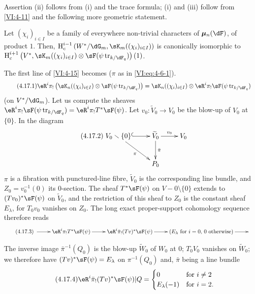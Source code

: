 Assertion (ii) follows from (i) and the trace formula; (i) and (iii)
follow from \ref{VI:4-11} and the following more geometric statement. 





\begin{proposition_}\label{VI:4-17}
Let $(\chi_i)_{i\in I}$ be a family of everywhere non-trivial characters of
$\dmu_n(\dF)$, of product $1$. Then, 
$\h_c^{i-1}\left(W^\ast/\dG_m,\sK_m((\chi_i)_{i\in I})\right)$ is
canonically isomorphic to 
\newline
$\h_c^{i+1}\left(V^\ast,\sK_m((\chi_i)_{i\in I})\otimes \sF(\psi\tr_{k/\dF_q})\right)(1)$. 
\end{proposition_}

The first line of \ref{VI:4-15} becomes ($\pi$ as in
\eqref{VI:eq:4-6-1}). 
\begin{equation*}\tag{4.17.1}\label{VI:eq:4-17-1}
  \eR^i \pi_!\left(\sK_n((\chi_i)_{i\in I})\otimes \sF(\psi \tr_{k/\dF_q})\right) = \sK_n((\chi_i)_{i\in I}) \otimes \eR^i \pi_! \sF(\psi\tr_{k/\dF_q}) 
\end{equation*}
(on $V^\ast/\dG_m$). Let us compute the sheaves
$\eR^i\pi_! \sF(\psi\tr_{k/\dF_q}) = \eR^i \pi_! T^\ast \sF(\psi)$. Let
$v_0:\widetilde V_0 \to V_0$ be the blow-up of $V_0$ at $\{0\}$. In the
diagram 
\begin{equation*}\tag{4.17.2}\label{VI:eq:4-17-2}
\xymatrix{
  V_0\setminus \{0\} \ar@{^{(}->}[r] \ar[dr]_-\pi 
    & \widetilde V_0 \ar[r]^-{v_0} \ar[d]^-{\bar\pi} 
    & V_0 \\
  & P_0 
}
\end{equation*}
$\pi$ is a fibration with punctured-line fibre, $\widetilde V_0$
is the corresponding line bundle, and $Z_0=v_0^{-1}(0)$ its $0$-section.
The sheaf $T^\ast\sF(\psi)$ on $V-0\setminus \{0\}$ extends to
$(T v_0)^\ast \sF(\psi)$ on $\widetilde V_0$, and the restriction of this sheaf
to $Z_0$ is the constant sheaf $E_\lambda$, for $T_0 v_0$ vanishes on
$Z_0$. The long exact proper-support cohomology sequence therefore
reads 
\begin{equation*}\tag{4.17.3}\label{VI:eq:4-17-3}
\xymatrix{
  \ar[r] 
    & \eR^i \pi_! T^\ast \sF(\psi) \ar[r] 
    & \eR^i \bar\pi_! (T v)^\ast \sF(\psi) \ar[r] 
    & (E_\lambda\text{ for $i=0$, $0$ otherwise}) \ar[r] 
    & 
}
\end{equation*}

The inverse image $\bar\pi^{-1}(Q_0)$ is the blow-up $\widetilde W_0$ of
$W_0$ at $0$; $T_0 V_0$ vanishes on $\widetilde W_0$; we therefore have
$(T v)^\ast \sF(\psi)=E_\lambda$ on $\pi^{-1}(Q_0)$ and, $\bar\pi$ being a
line bundle 
\begin{equation*}\tag{4.17.4}\label{VI:eq:4-17-4}
  \eR^i \bar\pi_! (T v)^\ast \sF(\psi)|Q = 
    \begin{cases}
      0 & \text{for $i\ne 2$} \\
      E_\lambda(-1) & \text{for $i=2$.} 
    \end{cases} 
\end{equation*}

